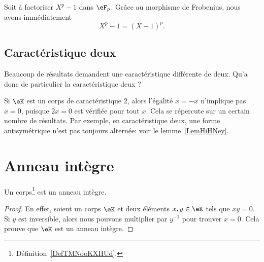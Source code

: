 \begin{example}
	Soit à factoriser \( X^p-1\) dans \( \eF_p\). Grâce au morphisme de Frobenius, nous avons immédiatement
	\begin{equation}
		X^p-1=(X-1)^p.
	\end{equation}
\end{example}



\subsection{Caractéristique deux}

Beaucoup de résultats demandent une caractéristique différente de deux. Qu'a donc de particulier la caractéristique deux ?

Si \( \eK\) est un corps de caractéristique \( 2\), alors l'égalité \( x=-x\) n'implique pas \( x=0\), puisque \( 2x=0\) est vérifiée pour tout \( x\). Cela se répercute sur un certain nombre de résultats. Par exemple, en caractéristique deux, une forme antisymétrique n'est pas toujours alternée: voir le lemme~\ref{LemHiHNey}.




\section{Anneau intègre}
\label{SECAnneauxIntegres}





\begin{lemma}     \label{LEMooZSMEooUmSXWZ}
	Un corps\footnote{Définition~\ref{DefTMNooKXHUd}.} est un anneau intègre.
\end{lemma}

\begin{proof}
	En effet, soient un corps \( \eK\) et deux éléments \( x,y\in \eK\) tels que \( xy=0\). Si \( y\) est inversible, alors nous pouvons multiplier par \( y^{-1}\) pour trouver \( x=0\). Cela prouve que \( \eK\) est un anneau intègre.
\end{proof}


